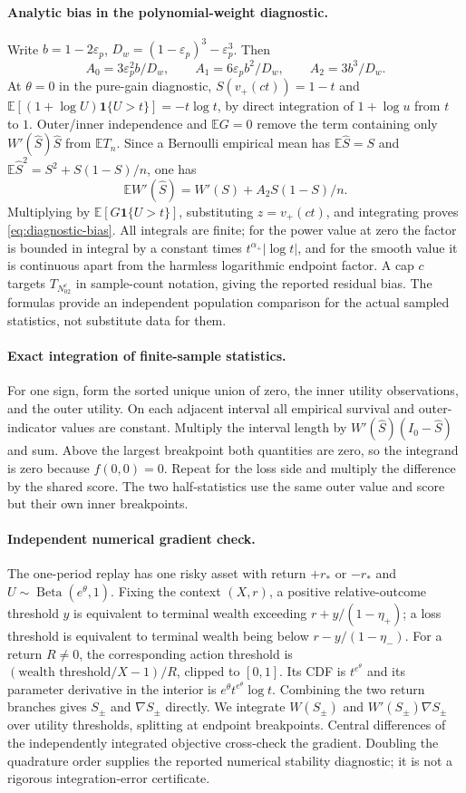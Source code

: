 \documentclass[11pt]{article}
\newcommand{\E}{\mathbb E}
\newcommand{\1}{\mathbf 1}
\newcommand{\eps}{\varepsilon}
\theoremstyle{definition}
\begin{document}
\paragraph{Analytic bias in the polynomial-weight diagnostic.}
Write $b=1-2\eps_p$, $D_w=(1-\eps_p)^3-\eps_p^3$. Then
\[
 A_0=3\eps_p^2b/D_w,\qquad A_1=6\eps_pb^2/D_w,
 \qquad A_2=3b^3/D_w.
\]
At $\theta=0$ in the pure-gain diagnostic, $S(v_+(ct))=1-t$ and
$\E[(1+\log U)\1\{U>t\}]=-t\log t$, by direct integration of $1+\log u$ from $t$ to $1$. Outer/inner independence and $\E G=0$ remove the term containing only $W'(\widehat S)\widehat S$ from $\E T_n$. Since a Bernoulli empirical mean has $\E\widehat S=S$ and $\E\widehat S^2=S^2+S(1-S)/n$, one has
\[
 \E W'(\widehat S)=W'(S)+A_2S(1-S)/n.
\]
Multiplying by $\E[G\1\{U>t\}]$, substituting $z=v_+(ct)$, and integrating proves \eqref{eq:diagnostic-bias}. All integrals are finite; for the power value at zero the factor is bounded in integral by a constant times $t^{\alpha_+}|\log t|$, and for the smooth value it is continuous apart from the harmless logarithmic endpoint factor. A cap $c$ targets $T_{N_02^c}$ in sample-count notation, giving the reported residual bias. The formulas provide an independent population comparison for the actual sampled statistics, not substitute data for them.

\paragraph{Exact integration of finite-sample statistics.}
For one sign, form the sorted unique union of zero, the inner utility observations, and the outer utility. On each adjacent interval all empirical survival and outer-indicator values are constant. Multiply the interval length by $W'(\widehat S)(I_0-\widehat S)$ and sum. Above the largest breakpoint both quantities are zero, so the integrand is zero because $f(0,0)=0$. Repeat for the loss side and multiply the difference by the shared score. The two half-statistics use the same outer value and score but their own inner breakpoints.

\paragraph{Independent numerical gradient check.}
The one-period replay has one risky asset with return $+r_*$ or $-r_*$ and $U\sim\operatorname{Beta}(e^\theta,1)$. Fixing the context $(X,r)$, a positive relative-outcome threshold $y$ is equivalent to terminal wealth exceeding $r+y/(1-\eta_+)$; a loss threshold is equivalent to terminal wealth being below $r-y/(1-\eta_-)$. For a return $R\ne0$, the corresponding action threshold is $(\text{wealth threshold}/X-1)/R$, clipped to $[0,1]$. Its CDF is $t^{e^\theta}$ and its parameter derivative in the interior is $e^\theta t^{e^\theta}\log t$. Combining the two return branches gives $S_\pm$ and $\nabla S_\pm$ directly. We integrate $W(S_\pm)$ and $W'(S_\pm)\nabla S_\pm$ over utility thresholds, splitting at endpoint breakpoints. Central differences of the independently integrated objective cross-check the gradient. Doubling the quadrature order supplies the reported numerical stability diagnostic; it is not a rigorous integration-error certificate.
\end{document}
